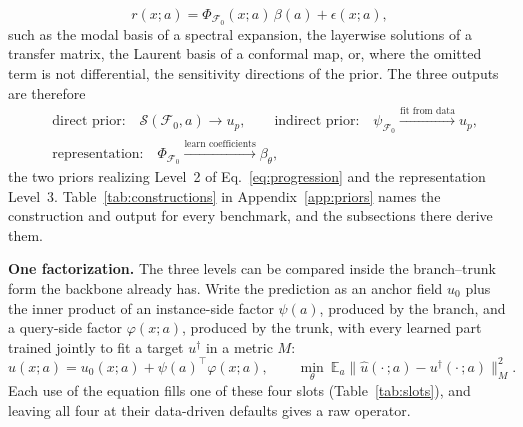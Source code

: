 \documentclass{article}
\begin{document}
\begin{equation}
r(x;a)=\Phi_{\mathcal{F}_0}(x;a)\,\beta(a)+\epsilon(x;a),
\label{eq:structure}
\end{equation}
such as the modal basis of a spectral expansion, the layerwise solutions of a transfer matrix, the Laurent basis of a conformal map, or, where the omitted term is not differential, the sensitivity directions of the prior. The three outputs are therefore
\begin{equation}
\begin{aligned}
& \text{direct prior:}\quad
\mathcal{S}(\mathcal{F}_0,a) \longrightarrow u_p, \qquad
\text{indirect prior:}\quad
\psi_{\mathcal{F}_0}
  \xrightarrow{\text{fit from data}} u_p,\\
& \text{representation:}\quad
\Phi_{\mathcal{F}_0}
  \xrightarrow{\text{learn coefficients}} \beta_\theta,
\end{aligned}
\label{eq:solve_outputs}
\end{equation}
the two priors realizing Level~2 of Eq.~\ref{eq:progression} and the representation Level~3. Table~\ref{tab:constructions} in Appendix~\ref{app:priors} names the construction and output for every benchmark, and the subsections there derive them.

\textbf{One factorization.}
The three levels can be compared inside the branch--trunk form the backbone already has. Write the prediction as an anchor field $u_0$ plus the inner product of an instance-side factor $\psi(a)$, produced by the branch, and a query-side factor $\varphi(x;a)$, produced by the trunk, with every learned part trained jointly to fit a target $u^\dagger$ in a metric $M$:
\begin{equation}
  \hat u(x;a) = u_0(x;a) + \psi(a)^{\!\top}\varphi(x;a),
  \qquad
  \min_{\theta}\ \mathbb{E}_{a}\bigl\|\hat u(\cdot\,;a)-u^{\dagger}(\cdot\,;a)\bigr\|_{M}^{2}.
  \label{eq:slots}
\end{equation}
Each use of the equation fills one of these four slots (Table~\ref{tab:slots}), and leaving all four at their data-driven defaults gives a raw operator.
\end{document}
